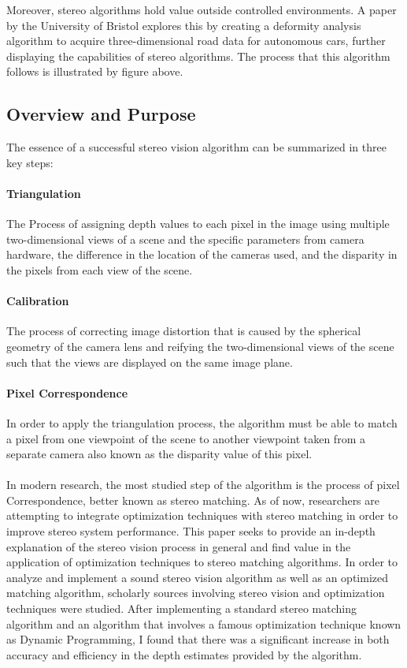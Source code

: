 \documentclass[11pt]{scrartcl}
\begin{document}
Moreover, stereo algorithms hold value outside controlled environments. A paper by the University of Bristol explores this by creating a deformity analysis algorithm  to acquire three-dimensional road data for autonomous cars, further displaying the
capabilities of stereo algorithms. The process that this algorithm follows is illustrated by
figure above.

\subsection{Overview and Purpose}

The essence of a successful stereo vision algorithm can be summarized in three key steps:

  \paragraph{ Triangulation} The Process of assigning depth values to each pixel in the image
        using multiple two-dimensional views of a scene and the specific parameters from
        camera hardware, the difference in the location of the cameras used, and the disparity in the
        pixels from each view of the scene.
    \paragraph{ Calibration}  The process of correcting image distortion that is caused by the
        spherical geometry of the camera lens
        and reifying the two-dimensional views of the scene such that
the views are displayed on the same image plane. 
  \paragraph{Pixel Correspondence} In order to apply the triangulation process, the algorithm must be
        able to match a pixel from one viewpoint of the scene to another viewpoint taken from a separate camera
        also known as the disparity value of this pixel.
\\

\\

In modern research, the most studied step of the algorithm is the process of pixel Correspondence, better known as stereo matching. As of now, researchers are attempting to integrate optimization techniques with stereo matching in order to improve stereo system performance. This paper seeks to provide an in-depth explanation of the stereo vision process in general and find value in the application of optimization techniques to stereo matching algorithms. In order to analyze and implement a sound stereo vision algorithm
as well as an optimized matching algorithm, scholarly sources involving stereo vision and optimization techniques were studied. After implementing a standard stereo matching algorithm and an algorithm that involves a famous optimization technique known as Dynamic Programming, I found that there was a significant increase
in both accuracy and efficiency in the depth estimates provided by the algorithm.
\end{document}
